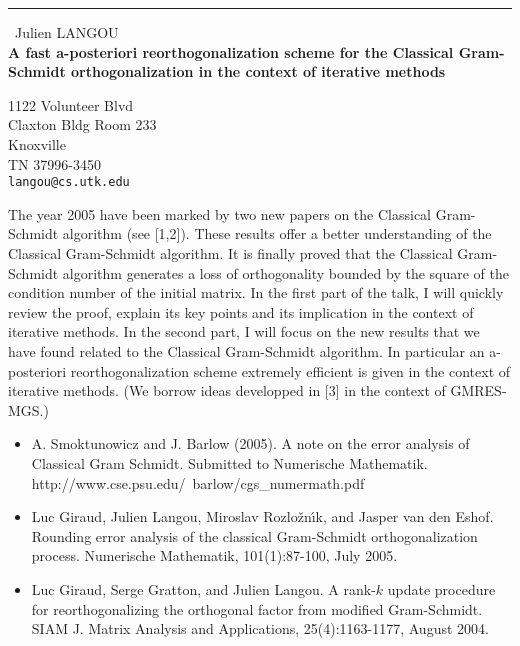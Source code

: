 \documentclass{report}
\begin{document}
\begin{center}
\rule{6in}{1pt} \
{\large Julien LANGOU \\
{\bf A fast a-posteriori reorthogonalization scheme for the Classical Gram-Schmidt orthogonalization in the context of iterative methods }}

1122 Volunteer Blvd \\ Claxton Bldg Room 233 \\ Knoxville \\ TN 37996-3450
\\
{\tt langou@cs.utk.edu}\end{center}


The year 2005 have been marked by two new papers on the Classical
Gram-Schmidt algorithm (see [1,2]). These results offer a better
understanding of the Classical Gram-Schmidt algorithm. It is finally
proved that the Classical Gram-Schmidt algorithm generates a loss of
orthogonality bounded by the square of the condition number of the
initial matrix. In the first part of the talk,
I will quickly review the proof, explain its key points and its
implication in the context of iterative methods. In the second part, I
will focus on the new results that we have found related to the Classical
Gram-Schmidt algorithm. In particular an a-posteriori reorthogonalization
scheme extremely efficient is given in the context of iterative methods.
(We borrow ideas developped in [3] in the context of GMRES-MGS.)


\begin{itemize}
\item A. Smoktunowicz and J. Barlow (2005).
A note on the error analysis of Classical Gram Schmidt.
Submitted to Numerische Mathematik.
http://www.cse.psu.edu/~barlow/cgs_numermath.pdf
\item Luc Giraud, Julien Langou, Miroslav Rozlo\v{z}n\'{\i}k, and Jasper van den Eshof.
Rounding error analysis of the classical Gram-Schmidt orthogonalization process.
Numerische Mathematik, 101(1):87-100, July 2005.
\item Luc Giraud, Serge Gratton, and Julien Langou.
A rank-$k$ update procedure for reorthogonalizing the orthogonal factor
from modified Gram-Schmidt.
SIAM J. Matrix Analysis and Applications, 25(4):1163-1177, August 2004.
\end{itemize}
\end{document}
